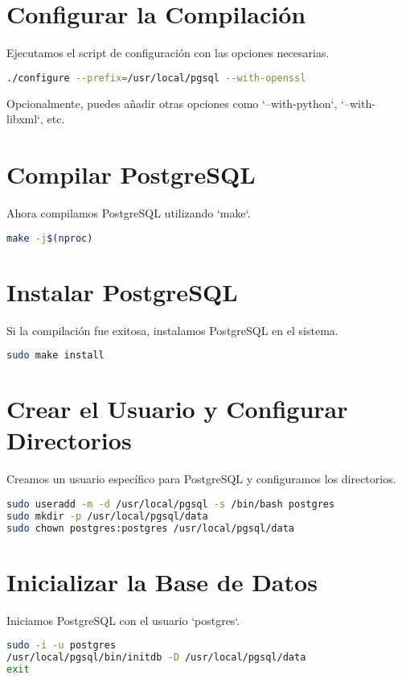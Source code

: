 \documentclass{article}
\begin{document}
\section{Configurar la Compilación}
Ejecutamos el script de configuración con las opciones necesarias.

\begin{lstlisting}[language=bash]
./configure --prefix=/usr/local/pgsql --with-openssl
\end{lstlisting}
Opcionalmente, puedes añadir otras opciones como `--with-python`, `--with-libxml`, etc.

\section{Compilar PostgreSQL}
Ahora compilamos PostgreSQL utilizando `make`.

\begin{lstlisting}[language=bash]
make -j$(nproc)
\end{lstlisting}

\section{Instalar PostgreSQL}
Si la compilación fue exitosa, instalamos PostgreSQL en el sistema.

\begin{lstlisting}[language=bash]
sudo make install
\end{lstlisting}

\section{Crear el Usuario y Configurar Directorios}
Creamos un usuario específico para PostgreSQL y configuramos los directorios.

\begin{lstlisting}[language=bash]
sudo useradd -m -d /usr/local/pgsql -s /bin/bash postgres
sudo mkdir -p /usr/local/pgsql/data
sudo chown postgres:postgres /usr/local/pgsql/data
\end{lstlisting}

\section{Inicializar la Base de Datos}
Iniciamos PostgreSQL con el usuario `postgres`.

\begin{lstlisting}[language=bash]
sudo -i -u postgres
/usr/local/pgsql/bin/initdb -D /usr/local/pgsql/data
exit
\end{lstlisting}
\end{document}
